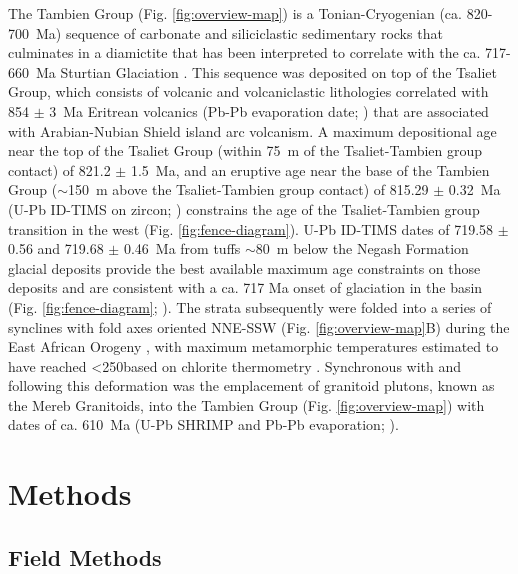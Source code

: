The Tambien Group (Fig. \ref{fig:overview-map}) is a Tonian-Cryogenian (ca. 820-700~Ma) sequence of carbonate and siliciclastic sedimentary rocks that culminates in a diamictite that has been interpreted to correlate with the ca. 717-660~Ma Sturtian Glaciation \citep{Beyth2003a, Alene2006a, Miller2009a, Swanson-Hysell2015a, MacLennan2018a}. This sequence was deposited on top of the Tsaliet Group, which consists of volcanic and volcaniclastic lithologies correlated with 854 $\pm$ 3~Ma Eritrean volcanics (Pb-Pb evaporation date; \citealp{Teklay1997a}) that are associated with Arabian-Nubian Shield island arc volcanism. A maximum depositional age near the top of the Tsaliet Group (within 75~m of the Tsaliet-Tambien group contact) of 821.2 $\pm$ 1.5~Ma, and an eruptive age near the base of the Tambien Group ($\sim$150~m above the Tsaliet-Tambien group contact) of 815.29 $\pm$ 0.32~Ma (U-Pb ID-TIMS on zircon; \citealp{Swanson-Hysell2015a}) constrains the age of the Tsaliet-Tambien group transition in the west (Fig. \ref{fig:fence-diagram}). U-Pb ID-TIMS dates of 719.58 $\pm$ 0.56 and 719.68 $\pm$ 0.46~Ma from tuffs $\sim$80~m below the Negash Formation glacial deposits provide the best available maximum age constraints on those deposits and are consistent with a ca. 717 Ma onset of glaciation in the basin (Fig. \ref{fig:fence-diagram}; \citealp{MacLennan2018a}). The strata subsequently were folded into a series of synclines with fold axes oriented NNE-SSW (Fig. \ref{fig:overview-map}B) during the East African Orogeny \citep{Stern1994a}, with maximum metamorphic temperatures estimated to have reached \textless250\degreesC based on chlorite thermometry \citep{Alene1998a}. Synchronous with and following this deformation was the emplacement of granitoid plutons, known as the Mereb Granitoids, into the Tambien Group (Fig. \ref{fig:overview-map}) with dates of ca. 610~Ma (U-Pb SHRIMP and Pb-Pb evaporation; \citealp{Miller2003a, Avigad2007a}).

\section{Methods}

\subsection{Field Methods}

